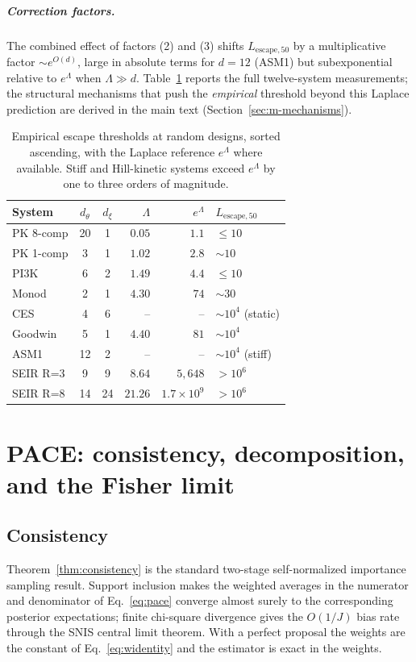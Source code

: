 \paragraph{Correction factors.}
The combined effect of factors (2) and (3) shifts $L_{\mathrm{escape},50}$ by a
multiplicative factor $\sim e^{O(d)}$, large in absolute terms for $d=12$ (ASM1) but
subexponential relative to $e^{\Lambda}$ when $\Lambda\gg d$. Table~\ref{tab:escape-full}
reports the full twelve-system measurements; the structural mechanisms that push the
\emph{empirical} threshold beyond this Laplace prediction are derived in the main text
(Section~\ref{sec:m-mechanisms}).

\begin{table}[h]
\centering\small
\caption[Full saturation thresholds]{Empirical escape thresholds at random designs,
sorted ascending, with the Laplace reference $e^\Lambda$ where available. Stiff and
Hill-kinetic systems exceed $e^\Lambda$ by one to three orders of magnitude.}
\label{tab:escape-full}
\begin{tabular}{lccrrl}
\toprule
System & $d_\theta$ & $d_\xi$ & $\Lambda$ & $e^{\Lambda}$ & $L_{\mathrm{escape},50}$ \\
\midrule
PK 8-comp & 20 & 1 & $0.05$ & $1.1$ & ${\le}10$ \\
PK 1-comp & 3 & 1 & $1.02$ & $2.8$ & ${\sim}10$ \\
PI3K      & 6 & 2 & $1.49$ & $4.4$ & ${\le}10$ \\
Monod     & 2 & 1 & $4.30$ & $74$ & ${\sim}30$ \\
CES       & 4 & 6 & -- & -- & ${\sim}10^4$ (static) \\
Goodwin   & 5 & 1 & $4.40$ & $81$ & ${\sim}10^4$ \\
ASM1      & 12 & 2 & -- & -- & ${\sim}10^4$ (stiff) \\
SEIR R=3  & 9 & 9 & $8.64$ & $5{,}648$ & ${>}10^6$ \\
SEIR R=8  & 14 & 24 & $21.26$ & $1.7{\times}10^9$ & ${>}10^6$ \\
\bottomrule
\end{tabular}
\end{table}

\chapter{PACE: consistency, decomposition, and the Fisher limit}
\label{app:pace}

\section{Consistency}
Theorem~\ref{thm:consistency} is the standard two-stage self-normalized importance
sampling result. Support inclusion makes the weighted averages in the numerator and
denominator of Eq.~\eqref{eq:pace} converge almost surely to the corresponding
posterior expectations; finite chi-square divergence gives the $O(1/J)$ bias rate
through the SNIS central limit theorem. With a perfect proposal the weights are the
constant of Eq.~\eqref{eq:widentity} and the estimator is exact in the weights.

